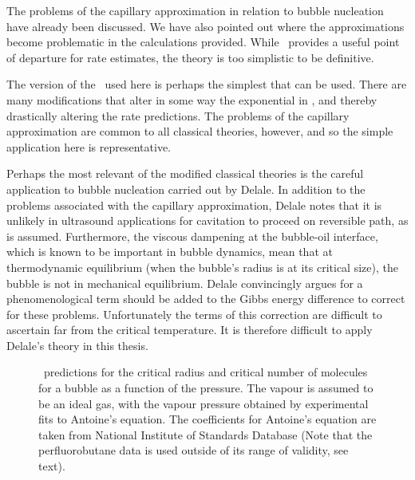 The problems of the capillary approximation in relation to bubble nucleation
have already been discussed.
We have also pointed out where the approximations become problematic in the calculations provided.
While \cnt\ provides a useful point of departure for rate estimates,
the theory is too simplistic to be definitive.

The version of the \cnt\ used here is perhaps the simplest that can be used.
There are many modifications that alter in some way the exponential in ,
and thereby drastically altering the rate predictions.
The problems of the capillary approximation are common to all classical theories, however, 
and so the simple application here is representative.

Perhaps the most relevant of the modified classical theories is the careful application to bubble nucleation carried out by Delale\cite{Delale2003}.
In addition to the problems associated with the capillary approximation,
Delale notes that it is unlikely in ultrasound applications for cavitation to proceed on  reversible path, as is assumed.
Furthermore, the viscous dampening at the bubble-oil interface, which is known to be important in bubble dynamics, mean that 
at thermodynamic equilibrium (when the bubble's radius is at its critical size),
the bubble is not in mechanical equilibrium.
Delale\cite{Delale2003}  convincingly argues for a phenomenological term should be added to the Gibbs energy difference to correct for these problems.
Unfortunately the terms of this correction are difficult to ascertain far from the critical temperature.
It is therefore difficult to apply Delale's theory in this thesis\cite{Delale2003}.


\begin{figure}
 \centering
  \label{fig:cnt:critical_radius}
  \subfloat[]{}
  \label{fig:cnt:critical_number}
  \subfloat[]{}
  \caption{
    \Cnt\ predictions for the critical radius and critical number of molecules for a bubble as a function of the pressure.  
    The vapour is assumed to be an ideal gas, with the vapour pressure obtained by experimental fits to Antoine's equation.
    The coefficients for Antoine's equation are taken from National Institute of Standards Database\cite{NISTdata}
    (Note that the perfluorobutane data is used outside of its range of validity, see text).
  }
 \label{fig:nucleation_radius}
\end{figure}
 
